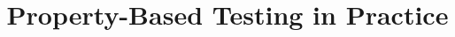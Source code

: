 \documentclass{NSF}
\begin{document}
\title{Property-Based Testing in Practice}
\newpage





\newpage{}


\newpage{}
\renewcommand\refname{References Cited}

% 


\newpage{}


\newpage{}


\newpage{}


\newpage{}


\newpage{}
\end{document}
